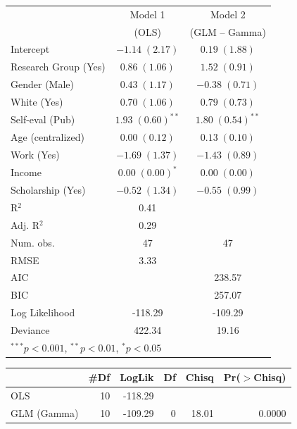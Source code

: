 \documentclass[a4paper, 12pt, openright, oneside, article, german, french, brazil, english]{abntex2}
\begin{document}
\begin{table}
	{\begin{tabular}{l c c }
			\hline
			& Model 1 & Model 2 \\
			& (OLS)   & (GLM -- Gamma) \\
			\hline
			Intercept    & $-1.14 \; (2.17)$     & $0.19 \; (1.88)$      \\
			Research Group (Yes) & $0.86 \; (1.06)$      & $1.52 \; (0.91)$      \\
			Gender (Male)  & $0.43 \; (1.17)$      & $-0.38 \; (0.71)$     \\
			White (Yes)    & $0.70 \; (1.06)$      & $0.79 \; (0.73)$      \\
			Self-eval (Pub)    & $1.93 \; (0.60)^{**}$ & $1.80 \; (0.54)^{**}$ \\
			Age (centralized)     & $0.00 \; (0.12)$      & $0.13 \; (0.10)$      \\
			Work (Yes)  & $-1.69 \; (1.37)$     & $-1.43 \; (0.89)$     \\
			Income     & $0.00 \; (0.00)^{*}$  & $0.00 \; (0.00)$      \\
			Scholarship (Yes) & $-0.52 \; (1.34)$     & $-0.55 \; (0.99)$     \\
			\hline
			R$^2$          & 0.41                  &                       \\
			Adj. R$^2$     & 0.29                  &                       \\
			Num. obs.      & 47                    & 47                    \\
			RMSE           & 3.33                  &                       \\
			AIC            &                       & 238.57                \\
			BIC            &                       & 257.07                \\
			Log Likelihood & -118.29               & -109.29               \\
			Deviance       & 422.34                & 19.16                 \\
			\hline
			\multicolumn{3}{l}{\scriptsize{$^{***}p<0.001$, $^{**}p<0.01$, $^*p<0.05$}}
		\end{tabular}
}
{}
\end{table}

\begin{table}[ht]
	{\begin{tabular}{lrrrrr}
		\hline
		& \#Df & LogLik & Df & Chisq & Pr($>$Chisq) \\ 
		\hline
		OLS & 10 & -118.29 &  &  &  \\ 
		GLM (Gamma) & 10 & -109.29 & 0 & 18.01 & 0.0000 \\   
		\hline
	\end{tabular}
}{}
\end{table}
\end{document}
